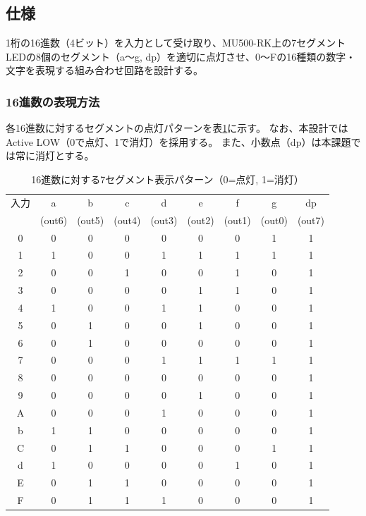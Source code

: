 \documentclass[a4paper,11pt]{ltjsarticle}
\begin{document}
\subsection{仕様}

1桁の16進数（4ビット）を入力として受け取り、MU500-RK上の7セグメントLEDの8個のセグメント（a〜g, dp）を適切に点灯させ、0〜Fの16種類の数字・文字を表現する組み合わせ回路を設計する。

\subsubsection{16進数の表現方法}

各16進数に対するセグメントの点灯パターンを表\ref{tab:seg_pattern}に示す。
なお、本設計ではActive LOW（0で点灯、1で消灯）を採用する。
また、小数点（dp）は本課題では常に消灯とする。

\begin{table}[h]
\centering
\caption{16進数に対する7セグメント表示パターン（0=点灯, 1=消灯）}
\label{tab:seg_pattern}
\begin{tabular}{c|cccccccc}
\toprule
入力 & a & b & c & d & e & f & g & dp \\
     & (out6) & (out5) & (out4) & (out3) & (out2) & (out1) & (out0) & (out7) \\
\midrule
0 & 0 & 0 & 0 & 0 & 0 & 0 & 1 & 1 \\
1 & 1 & 0 & 0 & 1 & 1 & 1 & 1 & 1 \\
2 & 0 & 0 & 1 & 0 & 0 & 1 & 0 & 1 \\
3 & 0 & 0 & 0 & 0 & 1 & 1 & 0 & 1 \\
4 & 1 & 0 & 0 & 1 & 1 & 0 & 0 & 1 \\
5 & 0 & 1 & 0 & 0 & 1 & 0 & 0 & 1 \\
6 & 0 & 1 & 0 & 0 & 0 & 0 & 0 & 1 \\
7 & 0 & 0 & 0 & 1 & 1 & 1 & 1 & 1 \\
8 & 0 & 0 & 0 & 0 & 0 & 0 & 0 & 1 \\
9 & 0 & 0 & 0 & 0 & 1 & 0 & 0 & 1 \\
A & 0 & 0 & 0 & 1 & 0 & 0 & 0 & 1 \\
b & 1 & 1 & 0 & 0 & 0 & 0 & 0 & 1 \\
C & 0 & 1 & 1 & 0 & 0 & 0 & 1 & 1 \\
d & 1 & 0 & 0 & 0 & 0 & 1 & 0 & 1 \\
E & 0 & 1 & 1 & 0 & 0 & 0 & 0 & 1 \\
F & 0 & 1 & 1 & 1 & 0 & 0 & 0 & 1 \\
\bottomrule
\end{tabular}
\end{table}
\end{document}
